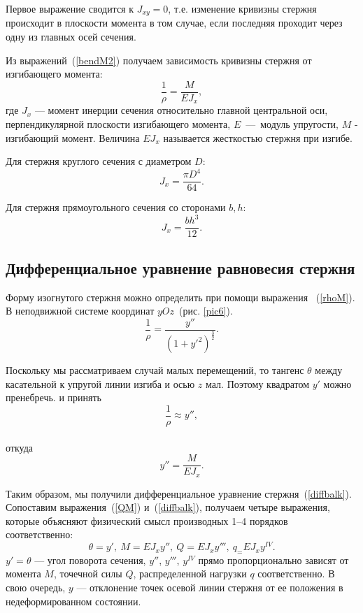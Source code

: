 \documentclass[12pt, a4paper]{article}
\begin{document}
Первое выражение сводится к $J_{xy} = 0$, т.е. изменение кривизны стержня происходит в плоскости момента в том случае, если последняя проходит через одну из главных осей сечения.

Из выражений~(\ref{bendM2}) получаем зависимость кривизны стержня от изгибающего момента:
\begin{equation}
 	\label{rhoM}
 	\frac{1}{\rho} = \frac{M}{E J_{x}}, 
 \end{equation}
где $J_{x}$ --- момент инерции сечения относительно главной центральной оси, перпендикулярной плоскости изгибающего момента, $E$~---~модуль упругости, $M$ - изгибающий момент. Величина $E J_{x}$ называется жесткостью стержня при изгибе.

Для стержня круглого сечения с диаметром $D$:
\begin{equation}
	\label{Jround}
	J_{x} = \frac{\pi D^4}{64}.
\end{equation}

Для стержня прямоугольного сечения со сторонами $b, h$:
\begin{equation}
	\label{Jsq}
	J_{x} = \frac{b h^3}{12}.
\end{equation}

\subsection{Дифференциальное уравнение равновесия стержня}
Форму изогнутого стержня можно определить при помощи выражения ~(\ref{rhoM}). В неподвижной системе координат $yOz$~(рис. \ref{pic6}). 
\begin{equation}
	\label{diffbalkf}
	\frac{1}{\rho} = \frac{y''}{(1 + y'^2)^{\frac{3}{2}}}.
\end{equation}

Поскольку мы рассматриваем случай малых перемещений, то тангенс $ \theta$ между касательной к упругой линии изгиба и осью $z$ мал. Поэтому квадратом $y'$ можно пренебречь. и принять
\begin{equation}
	\label{diffbalkcurve}
	\frac{1}{\rho} \approx y'',
\end{equation}
\\откуда 
\begin{equation}
	\label{diffbalk}
	y'' = \frac{M}{E J_{x}}.
\end{equation}

Таким образом, мы получили дифференциальное уравнение стержня~(\ref{diffbalk}). 
Сопоставим выражения~(\ref{QM}) и~(\ref{diffbalk}), получаем четыре выражения, которые объясняют физический смысл производных 1--4 порядков соответственно:
\begin{equation}
	\label{diffbb4}
	\theta = y',~M = E J_{x} y'',~Q = E J_{x} y''',~
	q_ = E J_{x} y^{IV}.
\end{equation}
$y' = \theta$ --- угол поворота сечения, $y''$, $y'''$, $y^{IV}$ прямо пропорционально зависят от момента $M$, точечной силы $Q$, распределенной нагрузки $q$ соответственно. В свою очередь, $y$ --- отклонение точек осевой линии стержня от ее положения в недеформированном состоянии.
\end{document}
